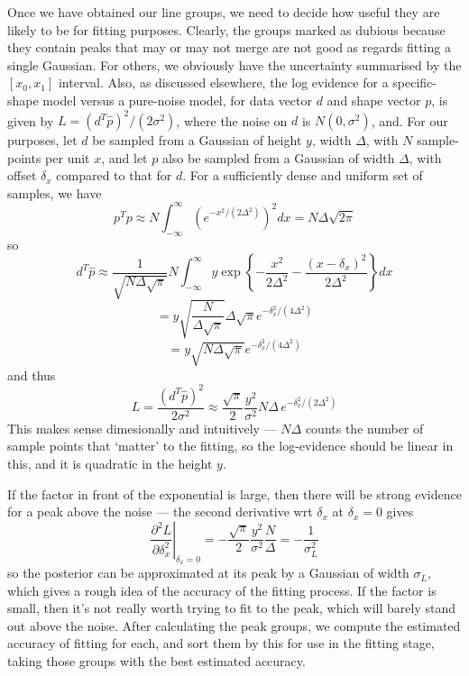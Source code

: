 Once we have obtained our line groups, we need to decide how useful they are
likely to be for fitting purposes. Clearly, the groups marked as dubious
because they contain peaks that may or may not merge are not good as regards
fitting a single Gaussian. For others, we obviously have the uncertainty
summarised by the $[x_0, x_1]$ interval. Also, as discussed elsewhere,
the log evidence for a specific-shape model versus a pure-noise
model, for data vector $d$ and shape vector $p$, is given by $L = (d^T 
\hat p)^2 / (2 \sigma^2)$, where the noise on $d$ is $N(0, \sigma^2)$,
and. For our purposes, let $d$ be sampled from a Gaussian of height $y$,
width $\Delta$, with $N$ sample-points per unit $x$,
and let $p$ also be sampled from a Gaussian of width $\Delta$, with
offset $\delta_x$ compared to that for $d$. 
For a sufficiently dense and uniform set of samples, we have 
\[
p^T p \approx N \int_{-\infty}^\infty \left(
e^{-x^2 / (2 \Delta^2)} \right)^2
 dx
= N \Delta \sqrt{2 \pi}
\]
so
\[
d^T \hat p \approx \frac{1}{\sqrt{N \Delta \sqrt{\pi}}} N
\int_{-\infty}^\infty
y \exp\left\{-\frac{x^2}{2 \Delta^2} - \frac{(x-\delta_x)^2}{2 \Delta^2}\right\} dx
\]
\[
= y \sqrt{\frac{N}{\Delta \sqrt{\pi}}} \Delta \sqrt\pi e^{-\delta_x^2 / (4 \Delta^2)}
\]
\[
= y \sqrt{N \Delta \sqrt\pi} e^{-\delta_x^2 / (4 \Delta^2)}
\]
and thus
\[
L = \frac{(d^T \hat p)^2}{2 \sigma^2} \approx 
\frac{\sqrt \pi}{2} \frac{y^2}{\sigma^2} N \Delta  \,
 e^{- \delta_x^2 / (2 \Delta^2)} 
\]
This makes sense dimesionally and intuitively --- $N \Delta$ counts the number
of sample points that `matter' to the fitting, so the log-evidence should be linear
in this, and it is quadratic in the height $y$.

If the factor in front of the exponential is large, then there will be strong
evidence for a peak above the noise --- the second derivative wrt $\delta_x$ at
$\delta_x = 0$ gives
\[
\left.\frac{\partial^2 L}{\partial \delta_x^2} \right|_{\delta_x = 0} = - \frac{\sqrt \pi}{2} \frac{y^2}{\sigma^2}\frac{N}{\Delta} = - \frac{1}{\sigma_L^2}
\] 
so the posterior can be approximated at its peak by a Gaussian of width
$\sigma_L$, which gives a rough idea of the accuracy of the fitting
process. If the factor is small, then it's not really worth trying to
fit to the peak, which will barely stand out above the noise. After
calculating the peak groups, we compute the estimated accuracy of
fitting for each, and sort them by this for use in the fitting stage,
taking those groups with the best estimated accuracy.


